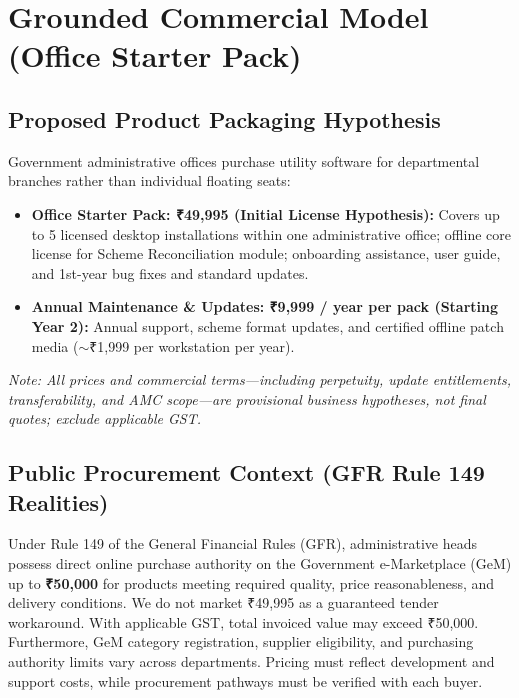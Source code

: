 \documentclass[11pt,a4paper]{article}
\begin{document}
\vspace{0.2cm}

\section{Grounded Commercial Model (Office Starter Pack)}

\subsection{Proposed Product Packaging Hypothesis}
Government administrative offices purchase utility software for departmental branches rather than individual floating seats:
\begin{itemize}
    \item \textbf{Office Starter Pack: ₹49,995 (Initial License Hypothesis):} Covers up to 5 licensed desktop installations within one administrative office; offline core license for Scheme Reconciliation module; onboarding assistance, user guide, and 1st-year bug fixes and standard updates.
    \item \textbf{Annual Maintenance \& Updates: ₹9,999 / year per pack (Starting Year 2):} Annual support, scheme format updates, and certified offline patch media ($\sim$₹1,999 per workstation per year).
\end{itemize}
\textit{Note: All prices and commercial terms---including perpetuity, update entitlements, transferability, and AMC scope---are provisional business hypotheses, not final quotes; exclude applicable GST.}

\subsection{Public Procurement Context (GFR Rule 149 Realities)}
Under Rule 149 of the General Financial Rules (GFR), administrative heads possess direct online purchase authority on the Government e-Marketplace (GeM) up to \textbf{₹50,000} for products meeting required quality, price reasonableness, and delivery conditions. We do not market ₹49,995 as a guaranteed tender workaround. With applicable GST, total invoiced value may exceed ₹50,000. Furthermore, GeM category registration, supplier eligibility, and purchasing authority limits vary across departments. Pricing must reflect development and support costs, while procurement pathways must be verified with each buyer.
\end{document}
